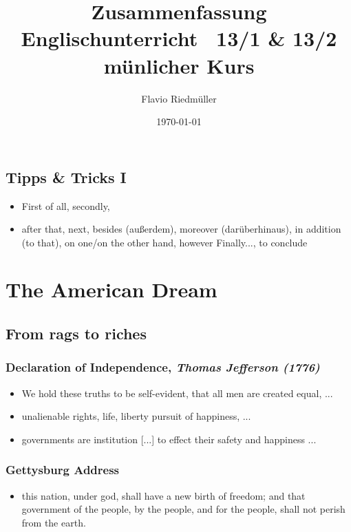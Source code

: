 \documentclass[a5paper,12pt,twoside,titlepage]{scrartcl}
\title{Zusammenfassung Englischunterricht\  \vspace{0.3cm} \small 13/1 \& 13/2 münlicher Kurs}
\author{Flavio Riedmüller}
\date{\today}
\begin{document}
\maketitle	
\tableofcontents
\setcounter{section}{0}
\subsection{Tipps \& Tricks I}
	\begin{itemize}
		\item 
		\subitem First of all, secondly, 
		\item 
		\subitem after that, next, besides (außerdem), moreover (darüberhinaus), in addition (to that), on one/on the other hand, however
		\subitem Finally..., to conclude
	\end{itemize}
\section{The American Dream}
	\subsection{From rags to riches}
		\subsubsection{Declaration of Independence, \it Thomas Jefferson (1776)}
			\begin{itemize}
			\item We hold these truths to be self-evident, that all men are created equal, ...
			\item unalienable rights, life, liberty pursuit of happiness, ...
			\item governments are institution [...] to effect their safety and happiness ...
			\end{itemize}
		\subsubsection{Gettysburg Address}
			\begin{itemize}
				\item this nation, under god, shall have a new birth of freedom; and that government of the people, by the people, and for the people, shall not perish from the earth.
			\end{itemize}
\end{document}
